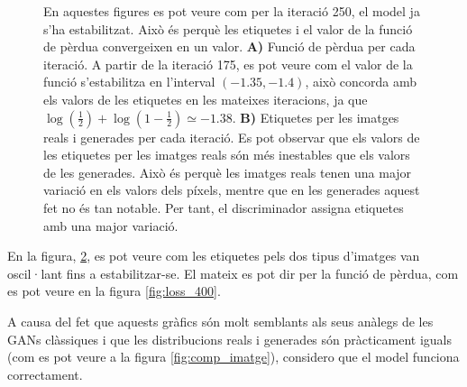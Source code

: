 \begin{figure}[H]
\begin{subfigure}{0.5\textwidth}
		\caption{} \label{fig:labels_400}
	\end{subfigure}
	\caption{En aquestes figures es pot veure com per la iteració 250, el model ja s'ha estabilitzat. Això és perquè les etiquetes i el valor de la funció de pèrdua convergeixen en un valor. \textbf{A)} Funció de pèrdua per cada iteració. A partir de la iteració 175, es pot veure com el valor de la funció s'estabilitza en l'interval $(-1.35, -1.4)$, això concorda amb els valors de les etiquetes en les mateixes iteracions, ja que $\log(\frac{1}{2}) + \log(1-\frac{1}{2}) \simeq -1.38$. \textbf{B)} Etiquetes per les imatges reals i generades per cada iteració. Es pot observar que els valors de les etiquetes per les imatges reals són més inestables que els valors de les generades. Això és perquè les imatges reals tenen una major variació en els valors dels píxels, mentre que en les generades aquest fet no és tan notable. Per tant, el discriminador assigna etiquetes amb una major variació.}
\end{figure}

En la figura, \ref{fig:labels_400}, es pot veure com les etiquetes pels dos tipus d'imatges van oscil·lant fins a estabilitzar-se. El mateix es pot dir per la funció de pèrdua, com es pot veure en la figura \ref{fig:loss_400}.  

A causa del fet que aquests gràfics són molt semblants als seus anàlegs de les GANs clàssiques i que les distribucions reals i generades són pràcticament iguals (com es pot veure a la figura \ref{fig:comp_imatge}), considero que el model funciona correctament.


